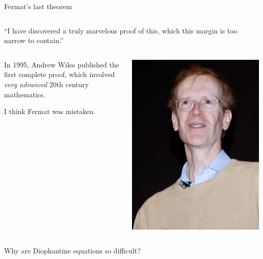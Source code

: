 \documentclass[10pt]{beamer}
\theoremstyle{definition}
\begin{document}
\begin{frame}[t]{Fermat's last theorem}
\begin{columns}[T]
\end{columns}

\vspace{0.5cm} ``I have discovered a truly marvelous proof of this, which this margin is too narrow to contain.''

\vspace{0.5cm}

\begin{columns}[T]

\begin{column}{0.8\textwidth}
In 1995, Andrew Wiles published the first complete proof, which involved \emph{very advanced} 20th century mathematics.

\vspace{0.5cm} I think Fermat was mistaken.
\end{column}

\begin{column}{0.1\textwidth}
\hspace{-1cm}
\includegraphics[width=1.5\textwidth]{wiles.jpg}
\end{column}

\end{columns}

Why are Diophantine equations so difficult?

\end{frame}
\end{document}
